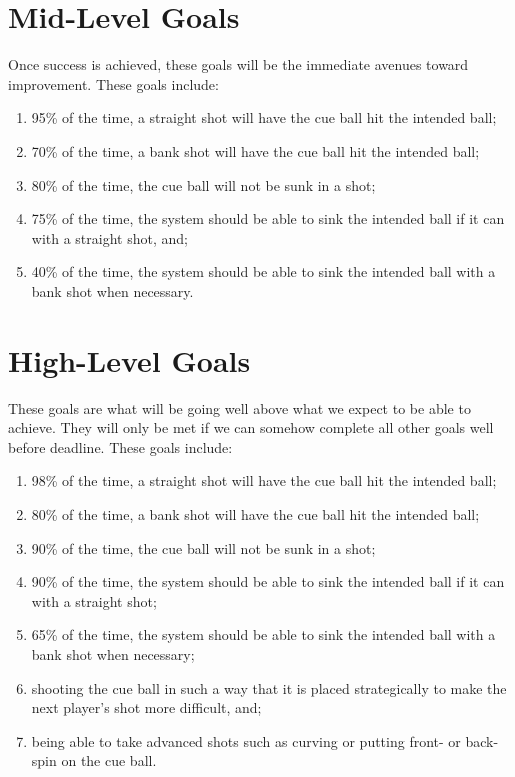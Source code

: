 \documentclass[titlepage]{article}
\begin{document}
\section{Mid-Level Goals}
Once success is achieved, these goals will be the immediate avenues toward improvement. These goals include:
\begin{enumerate}
	\item 95\% of the time, a straight shot will have the cue ball hit the intended ball;
	\item 70\% of the time, a bank shot will have the cue ball hit the intended ball;
	\item 80\% of the time, the cue ball will not be sunk in a shot;
	\item 75\% of the time, the system should be able to sink the intended ball if it can with a straight shot, and;
	\item 40\% of the time, the system should be able to sink the intended ball with a bank shot when necessary.
\end{enumerate}

\section{High-Level Goals}
These goals are what will be going well above what we expect to be able to achieve. They will only be met if we can somehow complete all other goals well before deadline. These goals include:
\begin{enumerate}
	\item 98\% of the time, a straight shot will have the cue ball hit the intended ball;
	\item 80\% of the time, a bank shot will have the cue ball hit the intended ball;
	\item 90\% of the time, the cue ball will not be sunk in a shot;
	\item 90\% of the time, the system should be able to sink the intended ball if it can with a straight shot;
	\item 65\% of the time, the system should be able to sink the intended ball with a bank shot when necessary;
	\item shooting the cue ball in such a way that it is placed strategically to make the next player's shot more difficult, and;
	\item being able to take advanced shots such as curving or putting front- or back-spin on the cue ball.
\end{enumerate}

\end{document}

